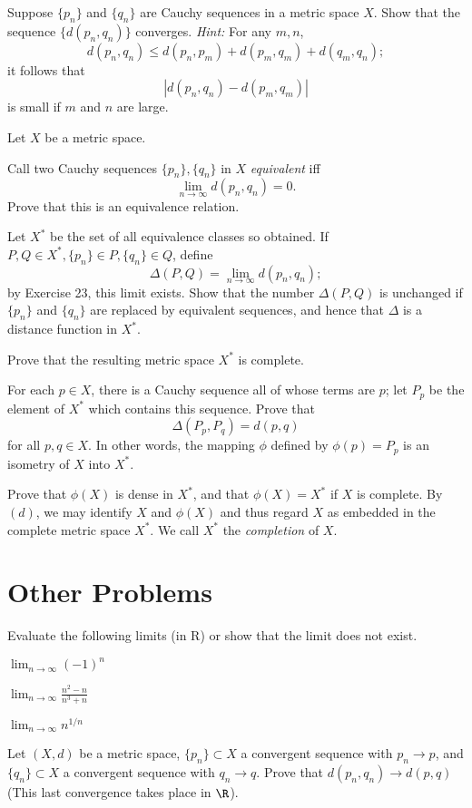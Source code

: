 \documentclass{assignment}
\begin{document}
\begin{question}[3.23]
  Suppose $\{p_n\}$ and $\{q_n\}$ are Cauchy sequences in a metric space $X$. Show that the sequence 
  $\{d(p_n, q_n)\}$ converges. \emph{Hint:} For any $m,n$, $$d(p_n, q_n) \leq d(p_n, p_m) + d(p_m, q_m)
    + d(q_m, q_n);$$ it follows that $$|d(p_n, q_n) - d(p_m, q_m)|$$ is small if $m$ and $n$ are large.
\end{question}

\begin{question}[3.24]
  Let $X$ be a metric space.
  \begin{qparts}
  \item Call two Cauchy sequences $\{p_n\}, \{q_n\}$ in $X$ \emph{equivalent} iff $$\lim_{n\to\infty}
    d(p_n, q_n) = 0.$$ Prove that this is an equivalence relation.
  \item Let $X^*$ be the set of all equivalence classes so obtained. If $P, Q\in X^*, \{p_n\}\in P,
    \{q_n\}\in Q$, define $$\Delta(P, Q) = \lim_{n\to\infty} d(p_n, q_n);$$ by Exercise 23, this limit
    exists. Show that the number $\Delta(P,Q)$ is unchanged if $\{p_n\}$ and $\{q_n\}$ are replaced
    by equivalent sequences, and hence that $\Delta$ is a distance function in $X^*$.
  \item Prove that the resulting metric space $X^*$ is complete.
  \item For each $p\in X$, there is a Cauchy sequence all of whose terms are $p$; let $P_p$ be the element
    of $X^*$ which contains this sequence. Prove that $$\Delta(P_p, P_q) = d(p, q)$$ for all $p,q\in X$.
    In other words, the mapping $\phi$ defined by $\phi(p) = P_p$ is an isometry of $X$ into $X^*$.
  \item Prove that $\phi(X)$ is dense in $X^*$, and that $\phi(X) = X^*$ if $X$ is complete. By $(d)$,
    we may identify $X$ and $\phi(X)$ and thus regard $X$ as embedded in the complete metric space $X^*$.
    We call $X^*$ the \emph{completion} of $X$.
\end{qparts}
\end{question}

\section*{Other Problems}
\begin{question}[1]
Evaluate the following limits (in R) or show that the limit does not exist.
\begin{qparts}
  \item $\lim_{n\to\infty}(-1)^n$
  \item $\lim_{n\to\infty} \frac{n^2 - n}{n^3 + n}$
  \item $\lim_{n\to\infty} n^{1/n}$
\end{qparts}
\end{question}

\begin{question}[2]
  Let $(X, d)$ be a metric space, $\{p_n\} \subset X$ a convergent sequence with $p_n \to p$, and 
  $\{q_n\} \subset X$ a convergent sequence with $q_n \to q$. Prove that $d(p_n, q_n) \to d(p, q)$
  (This last convergence takes place in $\R$).
\end{question}
\end{document}
